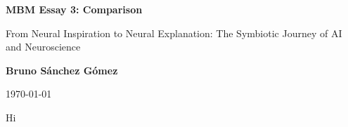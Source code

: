 \documentclass[11pt,a4paper]{article}
\author{Bruno Sánchez Gómez}
\date{\today}
\begin{document}
\begin{titlepage}
    \centering
    \vspace*{2cm}
    {\Huge \bfseries MBM Essay 3: Comparison \par}
    \vspace{2cm}
    {\huge From Neural Inspiration to Neural Explanation: The Symbiotic Journey of AI and Neuroscience \par}
    \vspace{10cm}
    {\large \textbf{Bruno Sánchez Gómez} \par}
    \vfill
    {\large \today \par}
\end{titlepage}

Hi

\clearpage
\nocite{*}
\printbibliography%
\end{document}
